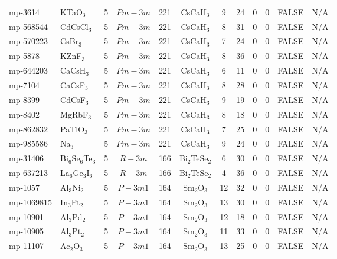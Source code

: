 {\begin{longtable}{llcccccccccc}
    mp-3614 & KTaO$_{3}$ & 5     & $Pm-3m$ & 221   & CsCaH$_{3}$ & 9     & 24    & 0     & 0     & FALSE & N/A \\
    mp-568544 & CdCsCl$_{3}$ & 5     & $Pm-3m$ & 221   & CsCaH$_{3}$ & 8     & 31    & 0     & 0     & FALSE & N/A \\
    mp-570223 & CsBr$_{3}$ & 5     & $Pm-3m$ & 221   & CsCaH$_{3}$ & 7     & 24    & 0     & 0     & FALSE & N/A \\
    mp-5878 & KZnF$_{3}$ & 5     & $Pm-3m$ & 221   & CsCaH$_{3}$ & 8     & 36    & 0     & 0     & FALSE & N/A \\
    mp-644203 & CaCsH$_{3}$ & 5     & $Pm-3m$ & 221   & CsCaH$_{3}$ & 6     & 11    & 0     & 0     & FALSE & N/A \\
    mp-7104 & CaCsF$_{3}$ & 5     & $Pm-3m$ & 221   & CsCaH$_{3}$ & 8     & 28    & 0     & 0     & FALSE & N/A \\
    mp-8399 & CdCsF$_{3}$ & 5     & $Pm-3m$ & 221   & CsCaH$_{3}$ & 9     & 19    & 0     & 0     & FALSE & N/A \\
    mp-8402 & MgRbF$_{3}$ & 5     & $Pm-3m$ & 221   & CsCaH$_{3}$ & 8     & 18    & 0     & 0     & FALSE & N/A \\
    mp-862832 & PaTlO$_{3}$ & 5     & $Pm-3m$ & 221   & CsCaH$_{3}$ & 7     & 25    & 0     & 0     & FALSE & N/A \\
    mp-985586 & Na$_{3}$ & 5     & $Pm-3m$ & 221   & CsCaH$_{3}$ & 9     & 24    & 0     & 0     & FALSE & N/A \\
    mp-31406 & Bi$_{6}$Se$_{6}$Te$_{3}$ & 5     & $R-3m$ & 166   & Bi$_{2}$TeSe$_{2}$ & 6     & 30    & 0     & 0     & FALSE & N/A \\
    mp-637213 & La$_{6}$Ge$_{3}$I$_{6}$ & 5     & $R-3m$ & 166   & Bi$_{2}$TeSe$_{2}$ & 4     & 36    & 0     & 0     & FALSE & N/A \\
    mp-1057 & Al$_{3}$Ni$_{2}$ & 5     & $P-3m1$ & 164   & Sm$_{2}$O$_{3}$ & 12    & 32    & 0     & 0     & FALSE & N/A \\
    mp-1069815 & In$_{3}$Pt$_{2}$ & 5     & $P-3m1$ & 164   & Sm$_{2}$O$_{3}$ & 13    & 30    & 0     & 0     & FALSE & N/A \\
    mp-10901 & Al$_{3}$Pd$_{2}$ & 5     & $P-3m1$ & 164   & Sm$_{2}$O$_{3}$ & 12    & 18    & 0     & 0     & FALSE & N/A \\
    mp-10905 & Al$_{3}$Pt$_{2}$ & 5     & $P-3m1$ & 164   & Sm$_{2}$O$_{3}$ & 11    & 33    & 0     & 0     & FALSE & N/A \\
    mp-11107 & Ac$_{2}$O$_{3}$ & 5     & $P-3m1$ & 164   & Sm$_{2}$O$_{3}$ & 13    & 25    & 0     & 0     & FALSE & N/A \\

\end{longtable}}
